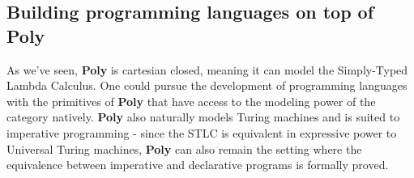 \subsection{Building programming languages on top of Poly}
As we've seen, \textbf{Poly} is cartesian closed, meaning it can model the Simply-Typed Lambda Calculus. One could pursue the development of programming languages with the primitives of \textbf{Poly} that have access to the modeling power of the category natively. \textbf{Poly} also naturally models Turing machines and is suited to imperative programming - since the STLC is equivalent in expressive power to Universal Turing machines, \textbf{Poly} can also remain the setting where the equivalence between imperative and declarative programs is formally proved.


